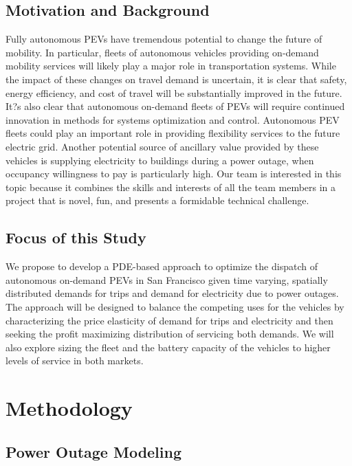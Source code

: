 \documentclass[journal]{IEEEtran}
\begin{document}
\subsection{Motivation and Background}
Fully autonomous PEVs have tremendous potential to change the future of mobility. In particular, fleets of autonomous vehicles providing on-demand mobility services will likely play a major role in transportation systems. While the impact of these changes on travel demand is uncertain, it is clear that safety, energy efficiency, and cost of travel will be substantially improved in the future. It?s also clear that autonomous on-demand fleets of PEVs will require continued innovation in methods for systems optimization and control.
Autonomous PEV fleets could play an important role in providing flexibility services to the future electric grid. Another potential source of ancillary value provided by these vehicles is supplying electricity to buildings during a power outage, when occupancy willingness to pay is particularly high. Our team is interested in this topic because it combines the skills and interests of all the team members in a project that is novel, fun, and presents a formidable technical challenge.
\subsection{Focus of this Study}
We propose to develop a PDE-based approach to optimize the dispatch of autonomous on-demand PEVs in San Francisco given time varying, spatially distributed demands for trips and demand for electricity due to power outages. The approach will be designed to balance the competing uses for the vehicles by characterizing the price elasticity of demand for trips and electricity and then seeking the profit maximizing distribution of servicing both demands. We will also explore sizing the fleet and the battery capacity of the vehicles to higher levels of service in both markets.

\section{Methodology}

\subsection{Power Outage Modeling}
\end{document}

